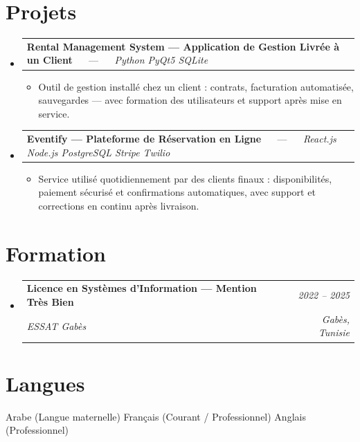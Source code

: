 \documentclass[letterpaper,9pt]{article}
\makeatletter
\newcommand{\resumeItem}[1]{\item\small{#1}}
\newcommand{\resumeSubheading}[4]{
  \vspace{-1pt}\item
  \begin{tabular*}{0.97\textwidth}[t]{l@{\extracolsep{\fill}}r}
    \textbf{#1} & \textit{\color{greytext}#2} \\
    \textit{\small\color{greytext} #3} & \textit{\small\color{greytext} #4}
  \end{tabular*}\vspace{-2pt}
}
\newcommand{\resumeProjectHeading}[2]{
  \item
  \begin{tabular*}{0.97\textwidth}{l@{\extracolsep{\fill}}r}
    \small #1 & #2
  \end{tabular*}\vspace{-1pt}
}
\newcommand{\resumeSubHeadingListStart}{\begin{itemize}[leftmargin=0.18in, label={}, itemsep=1.2pt, topsep=2.5pt, parsep=0pt]}
\newcommand{\resumeSubHeadingListEnd}{\end{itemize}\vspace{-2pt}}
\newcommand{\resumeProjectListStart}{\begin{itemize}[leftmargin=0.24in, label={}, itemsep=0.9pt, topsep=1.2pt, parsep=0pt]}
\newcommand{\resumeProjectListEnd}{\end{itemize}\vspace{-2pt}}
\makeatother
\begin{document}
\section{Projets}
\resumeSubHeadingListStart

  \resumeProjectHeading{\textbf{Rental Management System --- Application de Gestion Livrée à un Client} $\quad$ --- $\quad$ \emph{\color{greytext}Python \textperiodcentered{} PyQt5 \textperiodcentered{} SQLite}}{}
    \resumeProjectListStart
      \resumeItem{Outil de gestion installé chez un client : contrats, facturation automatisée, sauvegardes — avec formation des utilisateurs et support après mise en service.}
    \resumeProjectListEnd

  \resumeProjectHeading{\textbf{Eventify --- Plateforme de Réservation en Ligne} $\quad$ --- $\quad$ \emph{\color{greytext}React.js \textperiodcentered{} Node.js \textperiodcentered{} PostgreSQL \textperiodcentered{} Stripe \textperiodcentered{} Twilio}}{}
    \resumeProjectListStart
      \resumeItem{Service utilisé quotidiennement par des clients finaux : disponibilités, paiement sécurisé et confirmations automatiques, avec support et corrections en continu après livraison.}
    \resumeProjectListEnd

\resumeSubHeadingListEnd\vspace{-3pt}

\section{Formation}
\resumeSubHeadingListStart
  \resumeSubheading{Licence en Systèmes d'Information --- Mention Très Bien}{2022 -- 2025}{ESSAT Gabès}{Gabès, Tunisie}
\resumeSubHeadingListEnd\vspace{-1pt}

\section{Langues}
\begin{itemize}[leftmargin=0.18in, label={}, topsep=2pt, itemsep=1pt, parsep=0pt]
\footnotesize{
  \item Arabe (Langue maternelle) \textperiodcentered{} Français (Courant / Professionnel) \textperiodcentered{} Anglais (Professionnel)
}
\end{itemize}
\end{document}
